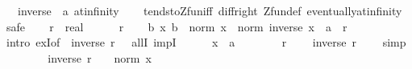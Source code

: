\begin{isabellebody}
\ \ \ {\isachardoublequoteopen}{\isacharparenleft}{\kern0pt}inverse\ {\isasymlonglongrightarrow}\ {\isacharparenleft}{\kern0pt}{}{\isacharcolon}{\kern0pt}{\isacharcolon}{\kern0pt}{\isacharprime}{\kern0pt}a{\isacharparenright}{\kern0pt}{\isacharparenright}{\kern0pt}\ at{\isacharunderscore}{\kern0pt}infinity{\isachardoublequoteclose}\isanewline
%
\isadelimproof
\ \ %
\endisadelimproof
%
\isatagproof
{}\isamarkupfalse%
\ tendsto{\isacharunderscore}{\kern0pt}Zfun{\isacharunderscore}{\kern0pt}iff\ diff{\isacharunderscore}{\kern0pt}{}{\isacharunderscore}{\kern0pt}right\ Zfun{\isacharunderscore}{\kern0pt}def\ eventually{\isacharunderscore}{\kern0pt}at{\isacharunderscore}{\kern0pt}infinity\isanewline
{}\isamarkupfalse%
\ safe\isanewline
\ \ \isamarkupfalse%
\ r\ {\isacharcolon}{\kern0pt}{\isacharcolon}{\kern0pt}\ real\isanewline
\ \ \isamarkupfalse%
\ {\isachardoublequoteopen}{}\ {\isacharless}{\kern0pt}\ r{\isachardoublequoteclose}\isanewline
\ \ \isamarkupfalse%
\ {\isachardoublequoteopen}{\isasymexists}b{\isachardot}{\kern0pt}\ {\isasymforall}x{\isachardot}{\kern0pt}\ b\ {\isasymle}\ norm\ x\ {\isasymlongrightarrow}\ norm\ {\isacharparenleft}{\kern0pt}inverse\ x\ {\isacharcolon}{\kern0pt}{\isacharcolon}{\kern0pt}\ {\isacharprime}{\kern0pt}a{\isacharparenright}{\kern0pt}\ {\isacharless}{\kern0pt}\ r{\isachardoublequoteclose}\isanewline
\ \ \isamarkupfalse%
\ {\isacharparenleft}{\kern0pt}intro\ exI{\isacharbrackleft}{\kern0pt}of\ {\isacharunderscore}{\kern0pt}\ {\isachardoublequoteopen}inverse\ {\isacharparenleft}{\kern0pt}r\ {\isacharslash}{\kern0pt}\ {}{\isacharparenright}{\kern0pt}{\isachardoublequoteclose}{\isacharbrackright}{\kern0pt}\ allI\ impI{\isacharparenright}{\kern0pt}\isanewline
\ \ \ \ \isamarkupfalse%
\ x\ {\isacharcolon}{\kern0pt}{\isacharcolon}{\kern0pt}\ {\isacharprime}{\kern0pt}a\isanewline
\ \ \ \ \isamarkupfalse%
\ {\isacartoucheopen}{}\ {\isacharless}{\kern0pt}\ r{\isacartoucheclose}\ \isamarkupfalse%
\ {\isachardoublequoteopen}{}\ {\isacharless}{\kern0pt}\ inverse\ {\isacharparenleft}{\kern0pt}r\ {\isacharslash}{\kern0pt}\ {}{\isacharparenright}{\kern0pt}{\isachardoublequoteclose}\ \isamarkupfalse%
\ simp\isanewline
\ \ \ \ \isamarkupfalse%
\ \isamarkupfalse%
\ {\isacharasterisk}{\kern0pt}{\isacharcolon}{\kern0pt}\ {\isachardoublequoteopen}inverse\ {\isacharparenleft}{\kern0pt}r\ {\isacharslash}{\kern0pt}\ {}{\isacharparenright}{\kern0pt}\ {\isasymle}\ norm\ x{\isachardoublequoteclose}\isanewline

\end{isabellebody}
